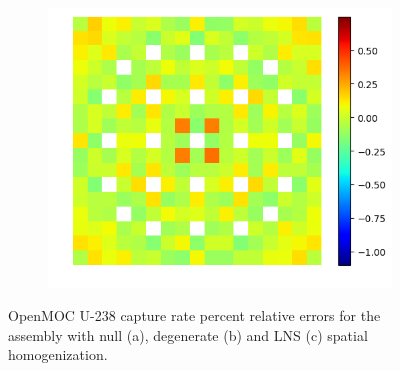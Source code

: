 \begin{figure}[H]
\begin{subfigure}{0.45\textwidth}
  \centering
  \includegraphics[width=\linewidth]{figures/assembly/capt-lns-errors}
  \caption{}
  \label{fig:assm-capt-lns-error}
\end{subfigure}
\caption{OpenMOC U-238 capture rate percent relative errors for the assembly with null (a), degenerate (b) and LNS (c) spatial homogenization.}
\label{fig:assm-capt-errors}
\end{figure}

